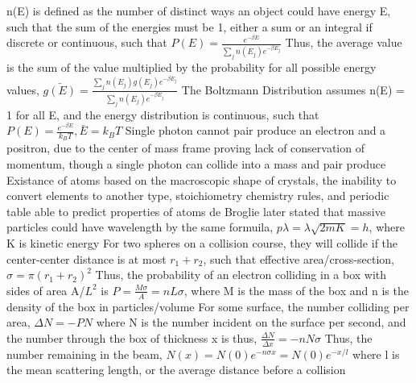 \documentclass[11 pt, twoside]{article}
\newenvironment{outline*}
{
	\begin{outline}[enumerate]
	}
	{\end{outline}
}
\begin{document}
\begin{outline*}
		\3 n(E) is defined as the number of distinct ways an object could have energy E, such that the sum of the energies must be 1, either a sum or an integral if discrete or continuous, such that $P(E) = \frac{e^{-\beta E}}{\sum_j n(E_j) e^{-\beta E_j}}$
	\2 Thus, the average value is the sum of the value multiplied by the probability for all possible energy values, $\bar{g(E)} = \frac{\sum_j n(E_j)g(E_j)e^{-\beta E_j}}{\sum_j n(E_j)e^{-\beta E_j}}$
	\2 The Boltzmann Distribution assumes n(E) = 1 for all E, and the energy distribution is continuous, such that $P(E) = \frac{e^{-\beta E}}{k_BT}, \bar{E} = k_BT$
\1 Single photon cannot pair produce an electron and a positron, due to the center of mass frame proving lack of conservation of momentum, though a single photon can collide into a mass and pair produce
\1 Existance of atoms based on the macroscopic shape of crystals, the inability to convert elements to another type, stoichiometry chemistry rules, and periodic table able to predict properties of atoms
\1 de Broglie later stated that massive particles could have wavelength by the same formuila, $p\lambda = \lambda \sqrt{2mK} = h$, where K is kinetic energy
\1 For two spheres on a collision course, they will collide if the center-center distance is at most $r_1 + r_2$, such that effective area/cross-section, $\sigma = \pi (r_1 + r_2)^2$
	\2 Thus, the probability of an electron colliding in a box with sides of area A/$L^2$ is $P = \frac{M\sigma}{A} = nL\sigma$, where M is the mass of the box and n is the density of the box in particles/volume
	\2 For some surface, the number colliding per area, $\Delta N = -PN$ where N is the number incident on the surface per second, and the number through the box of thickness x is thus, $\frac{\Delta N}{\Delta x} = -nN\sigma$
	\2 Thus, the number remaining in the beam, $N(x) = N(0)e^{-n\sigma x} = N(0)e^{-x/l}$ where l is the mean scattering length, or the average distance before a collision
\end{outline*}
\end{document}
